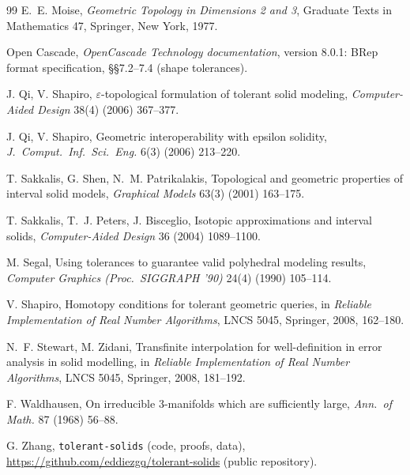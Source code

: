\documentclass[preprint,12pt]{elsarticle}
\theoremstyle{definition}
\theoremstyle{remark}
\begin{document}
\begin{thebibliography}{99}
 E.~E. Moise, \emph{Geometric Topology in Dimensions 2 and 3}, Graduate Texts in Mathematics 47,
Springer, New York, 1977.

 Open Cascade, \emph{OpenCascade Technology documentation}, version 8.0.1: BRep format specification,
\S\S7.2--7.4 (shape tolerances).

 J. Qi, V. Shapiro, $\varepsilon$-topological formulation of tolerant solid modeling,
\emph{Computer-Aided Design} 38(4) (2006) 367--377.

 J. Qi, V. Shapiro, Geometric interoperability with epsilon solidity, \emph{J.\ Comput.\ Inf.\
Sci.\ Eng.} 6(3) (2006) 213--220.

 T. Sakkalis, G. Shen, N.~M. Patrikalakis, Topological and geometric properties of interval solid
models, \emph{Graphical Models} 63(3) (2001) 163--175.

 T. Sakkalis, T.~J. Peters, J. Bisceglio, Isotopic approximations and interval solids,
\emph{Computer-Aided Design} 36 (2004) 1089--1100.

 M. Segal, Using tolerances to guarantee valid polyhedral modeling results, \emph{Computer
Graphics (Proc.\ SIGGRAPH '90)} 24(4) (1990) 105--114.

 V. Shapiro, Homotopy conditions for tolerant geometric queries, in \emph{Reliable Implementation
of Real Number Algorithms}, LNCS 5045, Springer, 2008, 162--180.

 N.~F. Stewart, M. Zidani, Transfinite interpolation for well-definition in error analysis in solid
modelling, in \emph{Reliable Implementation of Real Number Algorithms}, LNCS 5045, Springer, 2008, 181--192.

 F. Waldhausen, On irreducible 3-manifolds which are sufficiently large, \emph{Ann.\ of
Math.} 87 (1968) 56--88.

 G. Zhang, \texttt{tolerant-solids} (code, proofs, data), \url{https://github.com/eddiezgq/tolerant-solids}
(public repository).

\end{thebibliography}
\end{document}
